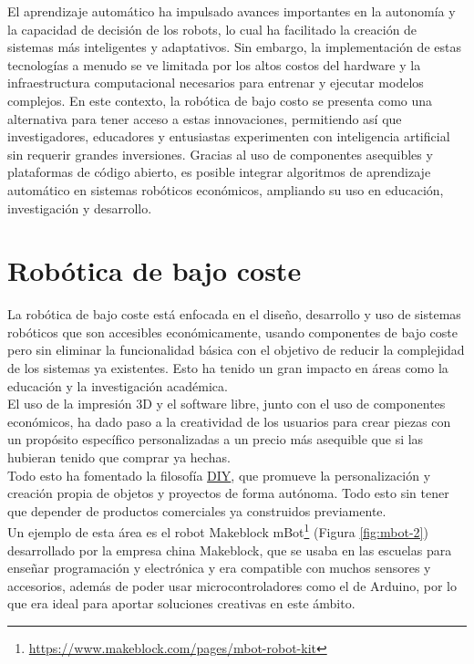 El aprendizaje automático ha impulsado avances importantes en la autonomía y la capacidad de decisión de los robots, lo cual ha facilitado la creación de sistemas más inteligentes y adaptativos. Sin embargo, la implementación de estas tecnologías a menudo se ve limitada por los altos costos del hardware y la infraestructura computacional necesarios para entrenar y ejecutar modelos complejos. En este contexto, la robótica de bajo costo se presenta como una alternativa para tener acceso a estas innovaciones, permitiendo así que investigadores, educadores y entusiastas experimenten con inteligencia artificial sin requerir grandes inversiones. Gracias al uso de componentes asequibles y plataformas de código abierto, es posible integrar algoritmos de aprendizaje automático en sistemas robóticos económicos, ampliando su uso en educación, investigación y desarrollo.

 
\label{sec:cuartaseccion}


\section{Robótica de bajo coste}
\label{sec:quintaseccion}

La robótica de bajo coste está enfocada en el diseño, desarrollo y uso de sistemas robóticos que son accesibles económicamente, usando componentes de bajo coste pero sin eliminar la funcionalidad básica con el objetivo de reducir la complejidad de los sistemas ya existentes. Esto ha tenido un gran impacto en áreas como la educación y la investigación académica.\\

El uso de la impresión 3D y el software libre, junto con el uso de componentes económicos, ha dado paso a la creatividad de los usuarios para crear piezas con un propósito específico personalizadas a un precio más asequible que si las hubieran tenido que comprar ya hechas.\\


Todo esto ha fomentado la filosofía \hyperlink{DIY}{DIY}, que promueve la personalización y creación propia de objetos y proyectos de forma autónoma. Todo esto sin tener que depender de productos comerciales ya construidos previamente.\\

Un ejemplo de esta área es el robot Makeblock mBot\footnote{\url{https://www.makeblock.com/pages/mbot-robot-kit}} (Figura \ref{fig:mbot-2}) desarrollado por la empresa china Makeblock, que se usaba en las escuelas para enseñar programación y electrónica y era compatible con muchos sensores y accesorios, además de poder usar microcontroladores como el de Arduino, por lo que era ideal para aportar soluciones creativas en este ámbito.

